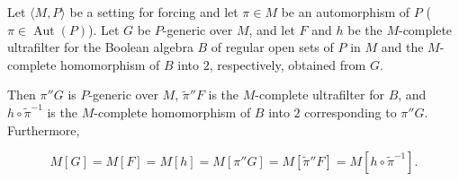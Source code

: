 Let $\langle M, P \rangle$ be a setting for forcing and let $\pi \in M$ be an automorphism of $P$ ($\pi \in \operatorname{Aut}(P)$). Let $G$ be $P$-generic over $M$, and let $F$ and $h$ be the $M$-complete ultrafilter for the Boolean algebra $B$ of regular open sets of $P$ in $M$ and the $M$-complete homomorphism of $B$ into $2$, respectively, obtained from $G$.

Then $\pi''G$ is $P$-generic over $M$, $\tilde{\pi}''F$ is the $M$-complete ultrafilter for $B$, and $h \circ \tilde{\pi}^{-1}$ is the $M$-complete homomorphism of $B$ into $2$ corresponding to $\pi''G$. Furthermore,

$$M[G] = M[F] = M[h] = M[\pi''G] = M[\tilde{\pi}''F] = M[h \circ \tilde{\pi}^{-1}].$$
